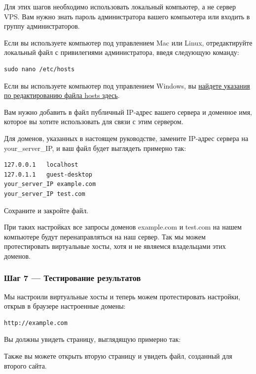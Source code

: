 \documentclass[14pt, a4paper]{article}
\begin{document}
Для этих шагов необходимо использовать локальный компьютер, а не сервер VPS. Вам нужно знать 
пароль администратора вашего компьютера или входить в группу администраторов.

Если вы используете компьютер под управлением Mac или Linux, отредактируйте локальный файл с 
привилегиями администратора, введя следующую команду:

\begin{lstlisting}
sudo nano /etc/hosts
\end{lstlisting}

Если вы используете компьютер под управлением Windows, вы \href{https://support.microsoft.com/en-ca/help/923947/you-cannot-modify-the-hosts-file-or-the-lmhosts-file-in-windows-vista}{найдете указания по редактированию файла hosts здесь}.

Вам нужно добавить в файл публичный IP-адрес вашего сервера и доменное имя, которое вы хотите использовать 
для связи с этим сервером.

Для доменов, указанных в настоящем руководстве, замените IP-адрес сервера на your\_server\_IP, и ваш файл 
будет выглядеть примерно так:

\begin{lstlisting}
127.0.0.1   localhost
127.0.1.1   guest-desktop
your_server_IP example.com
your_server_IP test.com
\end{lstlisting}
Сохраните и закройте файл.

При таких настройках все запросы доменов example.com и test.com на нашем компьютере будут 
перенаправляться на наш сервер. Так мы можем протестировать виртуальные хосты, хотя и не 
являемся владельцами этих доменов.

\subsubsection*{Шаг 7 — Тестирование результатов}

Мы настроили виртуальные хосты и теперь можем протестировать настройки, открыв в браузере настроенные домены:

\begin{lstlisting}
http://example.com
\end{lstlisting}
Вы должны увидеть страницу, выглядящую примерно так:

\begin{figure}[h]%
    \centering
    \label{1.12}
\end{figure}
Также вы можете открыть вторую страницу и увидеть файл, созданный для второго сайта.
\end{document}
